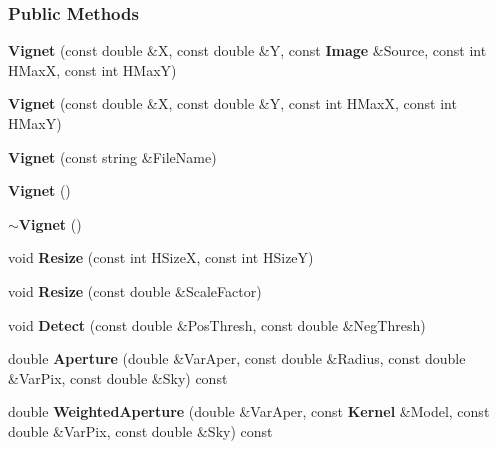 \subsubsection*{Public Methods}
\begin{CompactItemize}
\item 
{}
{\bf Vignet} (const double \&X, const double \&Y, const {\bf Image} \&Source, const int HMax\-X, const int HMax\-Y)\label{class_vignet_a0}

\item 
{}
{\bf Vignet} (const double \&X, const double \&Y, const int HMax\-X, const int HMax\-Y)\label{class_vignet_a1}

\item 
{}
{\bf Vignet} (const string \&File\-Name)\label{class_vignet_a2}

\item 
{}
{\bf Vignet} ()\label{class_vignet_a3}

\item 
{}
{\bf $\sim$Vignet} ()\label{class_vignet_a4}

\item 
{}
void {\bf Resize} (const int HSize\-X, const int HSize\-Y)\label{class_vignet_a5}

\item 
{}
void {\bf Resize} (const double \&Scale\-Factor)\label{class_vignet_a6}

\item 
{}
void {\bf Detect} (const double \&Pos\-Thresh, const double \&Neg\-Thresh)\label{class_vignet_a7}

\item 
{}
double {\bf Aperture} (double \&Var\-Aper, const double \&Radius, const double \&Var\-Pix, const double \&Sky) const\label{class_vignet_a8}

\item 
{}
double {\bf Weighted\-Aperture} (double \&Var\-Aper, const {\bf Kernel} \&Model, const double \&Var\-Pix, const double \&Sky) const\label{class_vignet_a9}


\end{CompactItemize}
